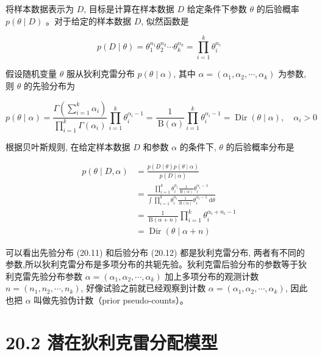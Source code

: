 \documentclass[10pt]{article}
\begin{document}
\begin{CJK*}{UTF8}{bsmi}
将样本数据表示为 $D$, 目标是计算在样本数据 $D$ 给定条件下参数 $\theta$ 的后验概率 $p(\theta \mid D)$ 。对于给定的样本数据 $D$, 似然函数是


\begin{equation*}
p(D \mid \theta)=\theta_{1}^{n_{1}} \theta_{2}^{n_{2}} \cdots \theta_{k}^{n_{k}}=\prod_{i=1}^{k} \theta_{i}^{n_{i}} \tag{20.10}
\end{equation*}


假设随机变量 $\theta$ 服从狄利克雷分布 $p(\theta \mid \alpha)$, 其中 $\alpha=\left(\alpha_{1}, \alpha_{2}, \cdots, \alpha_{k}\right)$ 为参数, 则 $\theta$ 的先验分布为


\begin{equation*}
p(\theta \mid \alpha)=\frac{\Gamma\left(\sum_{i=1}^{k} \alpha_{i}\right)}{\prod_{i=1}^{k} \Gamma\left(\alpha_{i}\right)} \prod_{i=1}^{k} \theta_{i}^{\alpha_{i}-1}=\frac{1}{\mathrm{~B}(\alpha)} \prod_{i=1}^{k} \theta_{i}^{\alpha_{i}-1}=\operatorname{Dir}(\theta \mid \alpha), \quad \alpha_{i}>0 \tag{20.11}
\end{equation*}


根据贝叶斯规则, 在给定样本数据 $D$ 和参数 $\alpha$ 的条件下, $\theta$ 的后验概率分布是


\begin{align*}
p(\theta \mid D, \alpha) & =\frac{p(D \mid \theta) p(\theta \mid \alpha)}{p(D \mid \alpha)} \\
& =\frac{\prod_{i=1}^{k} \theta_{i}^{n_{i}} \frac{1}{\mathrm{~B}(\alpha)} \theta_{i}^{\alpha_{i}-1}}{\int \prod_{i=1}^{k} \theta_{i}^{n_{i}} \frac{1}{\mathrm{~B}(\alpha)} \theta_{i}^{\alpha_{i}-1} \mathrm{~d} \theta} \\
& =\frac{1}{\mathrm{~B}(\alpha+n)} \prod_{i=1}^{k} \theta_{i}^{\alpha_{i}+n_{i}-1} \\
& =\operatorname{Dir}(\theta \mid \alpha+n) \tag{20.12}
\end{align*}


可以看出先验分布 (20.11) 和后验分布 (20.12) 都是狄利克雷分布, 两者有不同的参数,所以狄利克雷分布是多项分布的共轭先验。狄利克雷后验分布的参数等于狄利克雷先验分布参数 $\alpha=\left(\alpha_{1}, \alpha_{2}, \cdots, \alpha_{k}\right)$ 加上多项分布的观测计数 $n=\left(n_{1}, n_{2}, \cdots, n_{k}\right)$, 好像试验之前就已经观察到计数 $\alpha=\left(\alpha_{1}, \alpha_{2}, \cdots, \alpha_{k}\right)$, 因此也把 $\alpha$ 叫做先验伪计数（prior pseudo-counts）。

\section*{20.2 潜在狄利克雷分配模型}

\end{CJK*}
\end{document}
